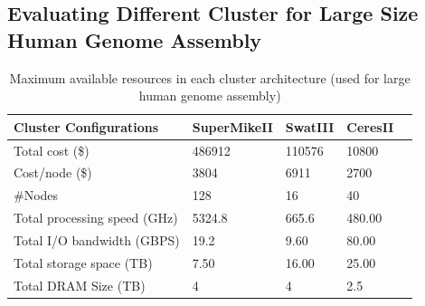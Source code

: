 \documentclass[journal]{IEEEtran}
\begin{document}
\subsection{Evaluating Different Cluster for Large Size Human Genome Assembly}
\begin{table}[!t]
\caption{Maximum available resources in each cluster architecture (used for large human genome assembly)}
\label{tab:TotalCluster}
\label{fig:perf}
\centering
\begin{tabular}{|p{2.5cm}|p{1.5cm}|p{1.5cm}|p{1.5cm}|p{1.5cm}|} \hline
Cluster Configurations & SuperMikeII & SwatIII & CeresII\\ \hline
Total cost (\$) & 486912 & 110576 & 10800\\ \hline
Cost/node (\$) & 3804 & 6911 & 2700\\ \hline
\#Nodes & 128 & 16 & 40\\ \hline
Total processing speed (GHz) & 5324.8 & 665.6 & 480.00\\ \hline
Total I/O bandwidth (GBPS) & 19.2 & 9.60 & 80.00\\ \hline
Total storage space (TB) & 7.50 & 16.00 & 25.00\\ \hline
Total DRAM Size (TB) & 4 & 4 & 2.5\\ \hline
\end{tabular}
\end{table}
\end{document}

